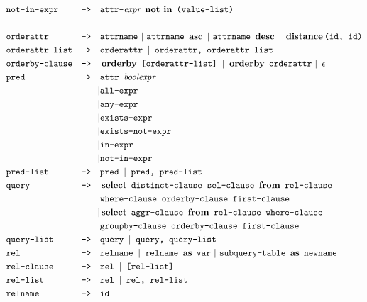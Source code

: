\begin{align*}
&\texttt{not-in-expr}&\texttt{-->}\quad &\texttt{attr-}\textit{expr}\ \op{not in}\ \texttt{(value-list)}\\									\\
&\texttt{orderattr}&\texttt{-->}\quad &\texttt{attrname}\	|\ \texttt{attrname}\ \op{asc}\	|\ \texttt{attrname}\ \op{desc}\ 	|\ \op{distance}\texttt{(id, id)}						\\
&\texttt{orderattr-list}&\texttt{-->}\quad &\texttt{orderattr }	|\texttt{ orderattr, orderattr-list}								\\
&\texttt{orderby-clause}&\texttt{-->}\quad &\op{orderby}\ \texttt{[orderattr-list] }	|\op{ orderby}\ \texttt{orderattr}\	|\ \op{$\epsilon$}	\\
&\texttt{pred}&\texttt{-->}\quad &\texttt{attr-}\textit{boolexpr}\\
&&|&\texttt{all-expr}\\
&&|&\texttt{any-expr}\\
&&|&\texttt{exists-expr}\\
&&|&\texttt{exists-not-expr}\\
&&|&\texttt{in-expr}\\
&&|&\texttt{not-in-expr}							\\
&\texttt{pred-list}&\texttt{-->}\quad &\texttt{pred }	|\texttt{ pred, pred-list}								\\
&\texttt{query}&\texttt{-->}\quad &\op{select}\ \texttt{distinct-clause sel-clause}\ \op{from}\ \texttt{rel-clause } \\
&&& \texttt{where-clause orderby-clause first-clause}	\\
&&|&\op{select}\ \texttt{aggr-clause}\ \op{from}\ \texttt{rel-clause where-clause }\\
&&&\texttt{groupby-clause orderby-clause first-clause}								\\
&\texttt{query-list}&\texttt{-->}\quad &\texttt{query }	|\texttt{ query, query-list}								\\
&\texttt{rel}&\texttt{-->}\quad &\texttt{relname }	|\texttt{ relname}\ \op{as}\ \texttt{var}\ |\ \texttt{subquery-table}\ \op{as}\ \texttt{newname}									\\
&\texttt{rel-clause}&\texttt{-->}\quad &\texttt{rel }	|\texttt{ [rel-list]}								\\
&\texttt{rel-list}&\texttt{-->}\quad &\texttt{rel }	|\texttt{ rel, rel-list}								\\
&\texttt{relname}&\texttt{-->}\quad &\texttt{id}									\\

\end{align*}
